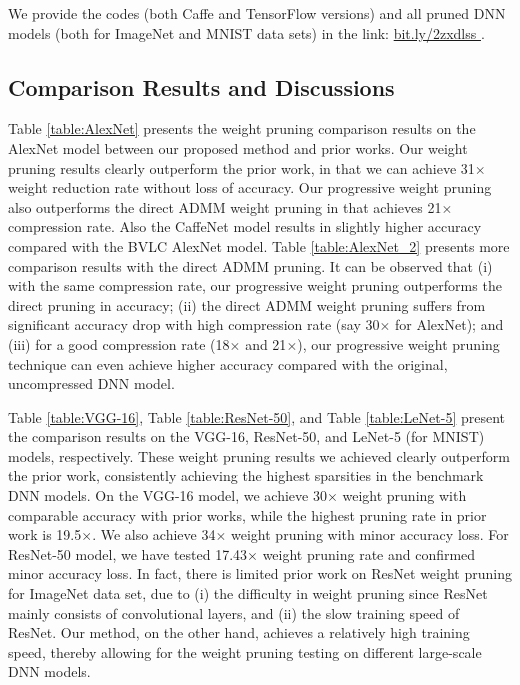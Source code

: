 \documentclass{article} %
\begin{document}
We provide the codes (both Caffe and TensorFlow versions) and all pruned DNN models (both for ImageNet and MNIST data sets) in the link: \url{bit.ly/2zxdlss	}.




\subsection{Comparison Results and Discussions}

Table \ref{table:AlexNet} presents the weight pruning comparison results on the AlexNet model between our proposed method and prior works. Our weight pruning results clearly outperform the prior work, in that we can achieve 31$\times$ weight reduction rate without loss of accuracy. 
Our progressive weight pruning also outperforms the direct ADMM weight pruning in \citet{zhang2018systematic} that achieves 21$\times$ compression rate. Also the CaffeNet model results in slightly higher accuracy compared with the BVLC AlexNet model. 
Table \ref{table:AlexNet_2} presents more comparison results with the direct ADMM pruning. It can be observed that (i) with the same compression rate, our progressive weight pruning outperforms the direct pruning in accuracy; (ii) the direct ADMM weight pruning suffers from significant accuracy drop with high compression rate (say 30$\times$ for AlexNet); and (iii) for a good compression rate (18$\times$ and 21$\times$), our progressive weight pruning technique can even achieve higher accuracy compared with the original, uncompressed DNN model.

Table \ref{table:VGG-16}, Table \ref{table:ResNet-50}, and Table \ref{table:LeNet-5} present the comparison results on the VGG-16, ResNet-50, and LeNet-5 (for MNIST) models, respectively. These weight pruning results we achieved clearly outperform the prior work, consistently achieving the highest sparsities in the benchmark DNN models. On the VGG-16 model, we achieve 30$\times$ weight pruning with comparable accuracy with prior works, while the highest pruning rate in prior work is 19.5$\times$. We also achieve 34$\times$ weight pruning with minor accuracy loss. For ResNet-50 model, we have tested 17.43$\times$ weight pruning rate and confirmed minor accuracy loss. In fact, there is limited prior work on ResNet weight pruning for ImageNet data set, due to (i) the difficulty in weight pruning since ResNet mainly consists of convolutional layers, and (ii) the slow training speed of ResNet. Our method, on the other hand, achieves a relatively high training speed, thereby allowing for the weight pruning testing on different large-scale DNN models.
\end{document}
